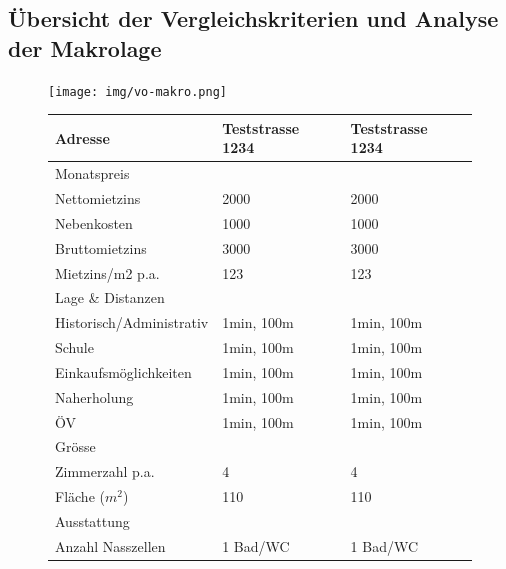 \documentclass{article}
\begin{document}
	\subsection{Übersicht der Vergleichskriterien und Analyse der Makrolage}
	\begin{figure}[!htbp]
		\begin{minipage}[c]{0.55\textwidth}
			\texttt{[image: img/vo-makro.png]}
		\end{minipage}\hfill
		\begin{minipage}[c]{0.44\textwidth}
			\begin{flushleft}
				\renewcommand{\arraystretch}{1.1}
				\setlength{\tabcolsep}{10pt}
				\begin{tabular}{ |l|l|l| } 
					\hline
					Adresse & \cellcolor{lightgray} Teststrasse 1234 & Teststrasse 1234\\ 
					\hline
					\rowcolor{gray} Monatspreis & &\\ 
					\hline
					Nettomietzins & \cellcolor{lightgray} 2000 & 2000\\ 
					\hline
					Nebenkosten & \cellcolor{lightgray} 1000 & 1000\\ 
					\hline
					Bruttomietzins & \cellcolor{lightgray} 3000 & 3000\\ 
					\hline
					Mietzins/m2 p.a. & \cellcolor{lightgray} 123 & 123\\ 
					\hline
					\rowcolor{gray} Lage \& Distanzen & &\\ 
					\hline
					Historisch/Administrativ & \cellcolor{lightgray} 1min, 100m & 1min, 100m\\ 
					\hline
					Schule & \cellcolor{lightgray} 1min, 100m & 1min, 100m\\ 
					\hline
					Einkaufsmöglichkeiten & \cellcolor{lightgray} 1min, 100m & 1min, 100m\\ 
					\hline
					Naherholung & \cellcolor{lightgray} 1min, 100m & 1min, 100m\\ 
					\hline
					ÖV & \cellcolor{lightgray} 1min, 100m & 1min, 100m\\ 
					\hline
					\rowcolor{gray} Grösse & &\\ 
					\hline
					Zimmerzahl p.a. & \cellcolor{lightgray} 4 & 4\\ 
					\hline
					Fläche ($m^2$) & \cellcolor{lightgray} 110 & 110\\ 
					\hline
					\rowcolor{gray} Ausstattung & & \\ 
					\hline
					Anzahl Nasszellen & \cellcolor{lightgray} 1 Bad/WC & 1 Bad/WC\\ 

\end{tabular}
\end{flushleft}
\end{minipage}
\end{figure}
\end{document}
